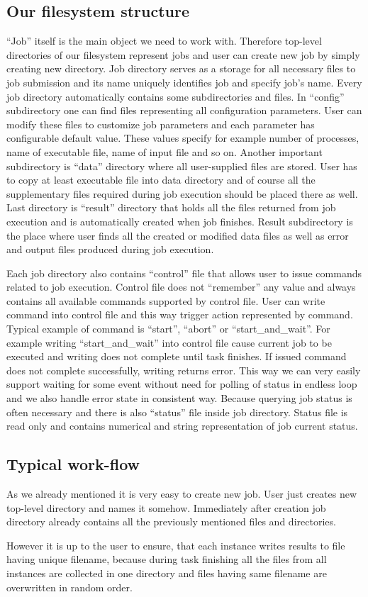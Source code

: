 \documentclass[a4paper,10pt,twocolumn]{article}
\newcommand{\term}[1]{``#1''}
\newcommand{\code}[1]{``#1''}
\begin{document}
\subsection{Our filesystem structure}
\code{Job} itself is the main object we need to work with. Therefore top-level directories of our filesystem represent jobs and user can create new job by simply creating new directory. Job directory serves as a storage for all necessary files to job submission and its name uniquely identifies job and specify job's name. Every job directory automatically contains some subdirectories and files. In \code{config} subdirectory one can find files representing all configuration parameters. User can modify these files to customize job parameters and each parameter has configurable default value. These values specify for example number of processes, name of executable file, name of input file and so on. Another important subdirectory is \code{data} directory where all user-supplied files are stored. User has to copy at least executable file into data directory and of course all the supplementary files required during job execution should be placed there as well. Last directory is \code{result} directory that holds all the files returned from job execution and is automatically created when job finishes. Result subdirectory is the place where user finds all the created or modified data files as well as error and output files produced during job execution.

Each job directory also contains \term{control} file that allows user to issue commands related to job execution. Control file does not ``remember'' any value and always contains all available commands supported by control file. User can write command into control file and this way trigger action represented by command. Typical example of command is \code{start}, \code{abort} or \code{start\_and\_wait}. For example writing \code{start\_and\_wait} into control file cause current job to be executed and writing does not complete until task finishes. If issued command does not complete successfully, writing returns error. This way we can very easily support waiting for some event without need for polling of status in endless loop and we also handle error state in consistent way. Because querying job status is often necessary and there is also \code{status} file inside job directory. Status file is read only and contains numerical and string representation of job current status.

\subsection{Typical work-flow}
As we already mentioned it is very easy to create new job. User just creates new top-level directory and names it somehow. Immediately after creation job directory already contains all the previously mentioned files and directories.

However it is up to the user to ensure, that each instance writes results to file having unique filename, because during task finishing all the files from all instances are collected in one directory and files having same filename are overwritten in random order.
\end{document}
